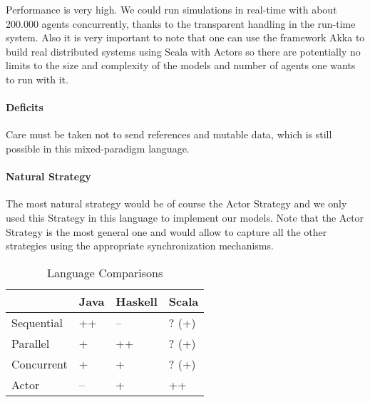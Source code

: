 Performance is very high. We could run simulations in real-time with about 200.000 agents concurrently, thanks to the transparent handling in the run-time system. Also it is very important to note that one can use the framework Akka to build real distributed systems using Scala with Actors so there are potentially no limits to the size and complexity of the models and number of agents one wants to run with it.

\paragraph{Deficits}
Care must be taken not to send references and mutable data, which is still possible in this mixed-paradigm language.

\paragraph{Natural Strategy}
The most natural strategy would be of course the Actor Strategy and we only used this Strategy in this language to implement our models. Note that the Actor Strategy is the most general one and would allow to capture all the other strategies using the appropriate synchronization mechanisms.



\begin{table*}[t]
\centering
\caption{Language Comparisons}
\label{tab:language_comparisons}
\begin{tabular}{l || l | l | l  }
	 			& Java 	& Haskell 	& Scala	\\ \hline \hline

Sequential		& ++	& --		& ? (+)		\\  
Parallel		& +		& ++		& ?	(+)	\\  
Concurrent		& +		& +			& ?	(+)	\\  
Actor			& --	& +			& ++	\\  

\end{tabular}
\end{table*}